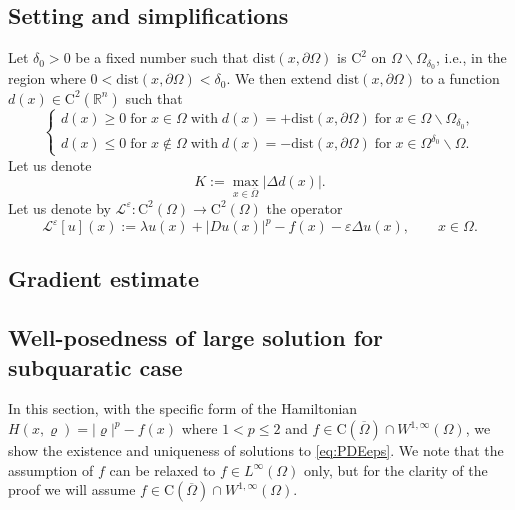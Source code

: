 \documentclass[11pt,reqno]{amsart}
\numberwithin{figure}{section}
\theoremstyle{plain}
\theoremstyle{remark}
\numberwithin{equation}{section}
\newcommand{\rmC}{\mathrm{C}}
\begin{document}
\subsection{Setting and simplifications} Let $\delta_0>0$ be a fixed number such that $\mathrm{dist}(x,\partial\Omega)$ is $\mathrm{C}^2$ on $\Omega\backslash \Omega_{\delta_0}$, i.e., in the region where $0<\mathrm{dist}(x,\partial\Omega) < \delta_0$. We then extend $\mathrm{dist}(x,\partial\Omega)$ to a function $d(x)\in \mathrm{C}^2(\mathbb{R}^n)$ such that 
\begin{equation*}
    \begin{cases}
    d(x)\geq 0\;\text{for}\;x\in\Omega\;\text{with}\;d(x) = +\mathrm{dist}(x,\partial\Omega)\;\text{for}\;x\in \Omega\backslash \Omega_{\delta_0},\\
    d(x)\leq 0\;\text{for}\;x\notin \Omega\;\text{with}\;d(x) = -\mathrm{dist}(x,\partial\Omega)\;\text{for}\;x\in \Omega^{\delta_0}\backslash \Omega.
    \end{cases}
\end{equation*}
Let us denote
\begin{equation*}
    K := \max_{x\in \overline{\Omega}} |\Delta d(x)|.
\end{equation*}
\noindent Let us denote by $\mathcal{L}^\varepsilon:\rmC^2(\Omega)\to \rmC^2(\Omega)$ the operator
\begin{equation*}
    \mathcal{L}^\varepsilon[u](x) := \lambda u(x) + |Du(x)|^p - f(x) - \varepsilon \Delta u(x), \qquad x\in \Omega.
\end{equation*}
\subsection{Gradient estimate} 





\subsection{Well-posedness of large solution for subquaratic case}

In this section, with the specific form of the Hamiltonian $H(x,\varrho) = |\varrho|^p - f(x)$ where $1<p\leq 2$ and $f\in \mathrm{C}(\overline{\Omega})\cap W^{1,\infty}(\Omega)$, we show the existence and uniqueness of solutions to \eqref{eq:PDEeps}. 
We note that the assumption of $f$ can be relaxed to $f\in L^\infty(\Omega)$ only, but for the clarity of the proof we will assume $f\in \mathrm{C}(\overline{\Omega})\cap W^{1,\infty}(\Omega)$.
\end{document}
